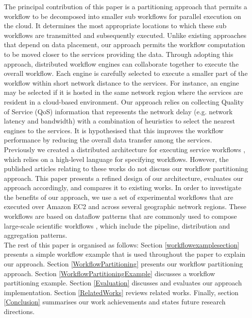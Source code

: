 \documentclass[10pt, conference, compsocconf]{IEEEtran}
\begin{document}
The principal contribution of this paper is a partitioning approach that permits a workflow to be decomposed into smaller sub workflows for parallel execution on the cloud.
It determines the most appropriate locations to which these sub workflows are transmitted and subsequently executed.
Unlike existing approaches that depend on data placement, our approach permits the workflow computation to be moved closer to the services providing the data.
Through adopting this approach, distributed workflow engines can collaborate together to execute the overall workflow.
Each engine is carefully selected to execute a smaller part of the workflow within short network distance to the services.
For instance, an engine may be selected if it is hosted in the same network region where the services are resident in a cloud-based environment.
Our approach relies on collecting Quality of Service (QoS) information that represents the network delay (e.g. network latency and bandwidth) with a combination of heuristics to select the nearest engines to the services.
It is hypothesised that this improves the workflow performance by reducing the overall data transfer among the services.\\

Previously we created a distributed architecture for executing service workflows  \cite{Architecture}, 
which relies on a high-level language \cite{Language} for specifying workflows.
However, the published articles relating to these works do not discuss our workflow partitioning approach.
This paper presents a refined design of our architecture, evaluates our approach accordingly, and compares it to existing works.
In order to investigate the benefits of our approach, we use a set of experimental workflows that are executed over Amazon EC2 and across several geographic network regions.
These workflows are based on dataflow patterns that are commonly used to compose large-scale scientific workflows \cite{barker2007scientific}, which include the pipeline, distribution and aggregation patterns.\\

The rest of this paper is organised as follows:
Section \ref{workflowexamplesection} presents a simple workflow example that is used throughout the paper to explain our approach.
Section \ref{WorkflowPartitioning} presents our workflow partitioning approach.
Section \ref{WorkflowPartitioningExample} discusses a workflow partitioning example.
Section \ref{Evaluation} discusses and evaluates our approach implementation.
Section \ref{RelatedWorks} reviews related works.
Finally, section \ref{Conclusion} summarises our work achievements and states future research directions.
\end{document}
